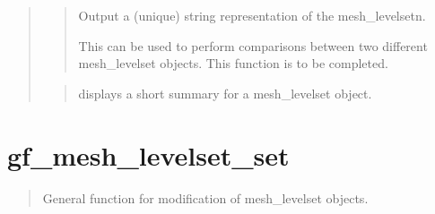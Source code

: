\documentclass[a4paper,11pt,english]{sphinxmanual}
\begin{document}
\begin{quote}
\begin{quote}
\sphinxAtStartPar
Output a (unique) string representation of the mesh\_levelsetn.

\sphinxAtStartPar
This can be used to perform comparisons between two
different mesh\_levelset objects.
This function is to be completed.
\end{quote}

\sphinxAtStartPar
{}
\begin{quote}

\sphinxAtStartPar
displays a short summary for a mesh\_levelset object.
\end{quote}
\end{quote}


\section{gf\_mesh\_levelset\_set}
\label{\detokenize{scilab/cmdref_gf_mesh_levelset_set:gf-mesh-levelset-set}}\label{\detokenize{scilab/cmdref_gf_mesh_levelset_set::doc}}
\sphinxAtStartPar
{}

\begin{sphinxVerbatim}[commandchars=\\\{\}]
    
    
  
\end{sphinxVerbatim}

\sphinxAtStartPar
{}
\begin{quote}

\sphinxAtStartPar
General function for modification of mesh\_levelset objects.
\end{quote}
\end{document}
